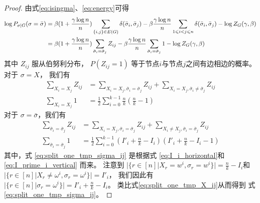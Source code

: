 \begin{proof}
  由式\eqref{eq:isingma}、\eqref{eq:energy}可得
	\begin{align}
  \log P_{\sigma|G}(\sigma=\bar{\sigma})
  & = 
  \beta(1 + \frac{\gamma \log n}{n}) \sum_{\{i,j\} \in E(G)}  \delta(\bar{\sigma}_i, \bar{\sigma}_j)  
	- \beta\frac{\gamma \log n}{n} \sum_{1\leq i<j \leq n} \delta(\bar{\sigma}_i, \bar{\sigma}_j)  - \log Z_G(\gamma, \beta)
  \notag\\
  & = 
  \beta(1 + \frac{\gamma \log n}{n}) \sum_{\bar{\sigma}_i = \bar{\sigma}_j} Z_{ij}
	- \beta\frac{\gamma \log n}{n}
  \sum_{\bar{\sigma}_i = \bar{\sigma}_j} 1 
  - \log Z_G(\gamma, \beta)
  \label{eq:log_P_sigma_G_bar_sigma}
  \end{align}
	其中 $Z_{ij}$ 服从伯努利分布，
  $P(Z_{ij}=1)$ 等于节点$i$与节点$j$之间有边相边的概率。
	对于 $\sigma = X$， 我们有
	\begin{align}
	\sum_{X_i = X_j} Z_{ij} &
  = \sum_{X_i = X_j, \bar{\sigma}_i = \bar{\sigma}_j}
  Z_{ij} + \sum_{X_i = X_j, \bar{\sigma}_i \neq \bar{\sigma}_j}
  Z_{ij}
  \label{eq:split_zij_tmp_X_ij}\\
	\sum_{X_i = X_j} 1 &= \frac{1}{2} \sum_{i=0}^{k-1} \frac{n}{k} 
  \left( \frac{n}{k} - 1 
  \right)\label{eq:split_one_tmp_X_ij}
	\end{align}
	对于 $\sigma = \bar{\sigma}$，我们有
	\begin{align}
	\sum_{\bar{\sigma}_i = \bar{\sigma}_j} Z_{ij} &= \sum_{X_i = X_j, \bar{\sigma}_i = \bar{\sigma}_j} Z_{ij} + \sum_{X_i \neq X_j, \bar{\sigma}_i = \bar{\sigma}_j} Z_{ij} 
  \label{eq:split_zij_tmp_sigma_ij}\\
	\sum_{\bar{\sigma}_i = \bar{\sigma}_j} 1 &= \frac{1}{2} \sum_{i=0}^{k-1} (I'_i + \frac{n}{k} - I_i) ( I'_i + \frac{n}{k} - I_i - 1)
  \label{eq:split_one_tmp_sigma_ij}
	\end{align}
  其中，式 \eqref{eq:split_one_tmp_sigma_ij} 是根据式
  \eqref{eq:I_i_horizontal}和 \eqref{eq:I_prime_i_vertical}
  而来。
	注意到
  $
  \Big|\{r\in [n] \big| X_r = w^i, \sigma_r=w^i \}\Big|
  =\frac{n}{k} - I_i$和
	$|\{r\in [n] | X_r \neq \omega^i, \sigma_r = \omega^i \}| = I'_i$，
	我们因此有  $|\{r\in [n] | \sigma_r = \omega^i \}| = I'_i + \frac{n}{k} - I_i $。
  类比式\eqref{eq:split_one_tmp_X_ij}从而得到
  式\eqref{eq:split_one_tmp_sigma_ij}。


\end{proof}
